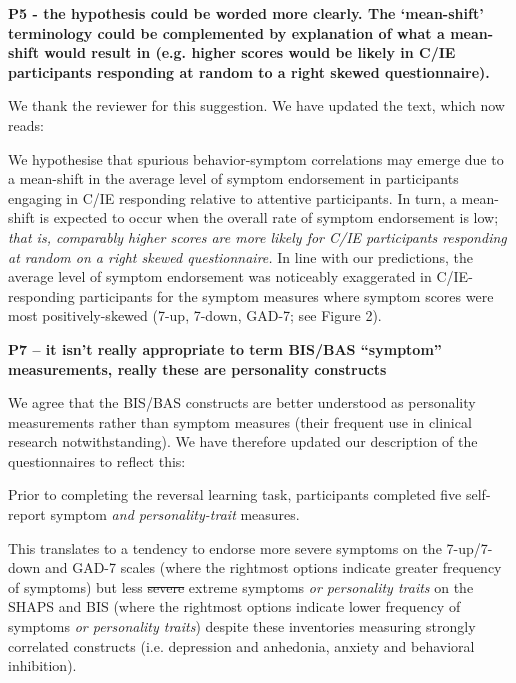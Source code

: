 \documentclass[a4paper,notitlepage,12pt]{article}
\begin{document}
\textbf{P5 - the hypothesis could be worded more clearly. The ‘mean-shift' terminology could be complemented by explanation of what a mean-shift would result in (e.g. higher scores would be likely in C/IE participants responding at random to a right skewed questionnaire).}

We thank the reviewer for this suggestion. We have updated the text, which now reads:

\begin{displayquote}
We hypothesise that spurious behavior-symptom correlations may emerge due to a mean-shift in the average level of symptom endorsement in participants engaging in C/IE responding relative to attentive participants. In turn, a mean-shift is expected to occur when the overall rate of symptom endorsement is low; \textit{that is, comparably higher scores are more likely for C/IE participants responding at random on a right skewed questionnaire.} In line with our predictions, the average level of symptom endorsement was noticeably exaggerated in C/IE-responding participants for the symptom measures where symptom scores were most positively-skewed (7-up, 7-down, GAD-7; see Figure 2). 
\end{displayquote}

\textbf{P7 – it isn't really appropriate to term BIS/BAS ``symptom'' measurements, really these are personality constructs}

We agree that the BIS/BAS constructs are better understood as personality measurements rather than symptom measures (their frequent use in clinical research notwithstanding). We have therefore updated our description of the questionnaires to reflect this:

\begin{displayquote}
Prior to completing the reversal learning task, participants completed five self-report symptom \textit{and personality-trait} measures.
\end{displayquote}

\begin{displayquote}
This translates to a tendency to endorse more severe symptoms on the 7-up/7-down and GAD-7 scales (where the rightmost options indicate greater frequency of symptoms) but less \st{severe} extreme symptoms \textit{or personality traits} on the SHAPS and BIS (where the rightmost options indicate lower frequency of symptoms\textit{ or personality traits}) despite these inventories measuring strongly correlated constructs (i.e. depression and anhedonia, anxiety and behavioral inhibition).
\end{displayquote}
\end{document}
